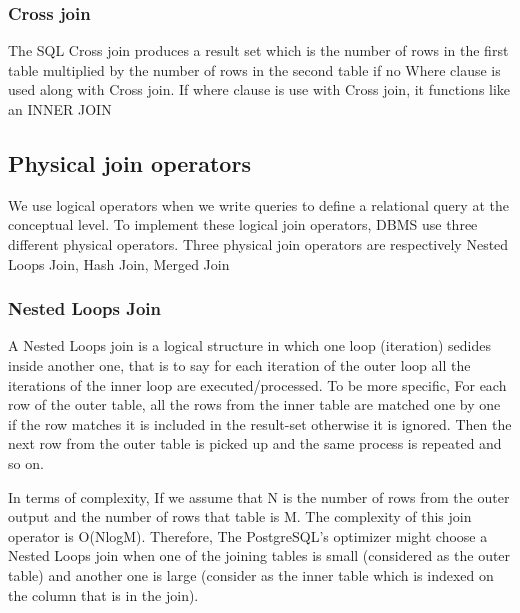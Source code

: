 \subsubsection{Cross join}
{\justify
The SQL Cross join produces a result set which is the number of rows in the first table multiplied by the number of rows in the second table if no Where clause is used along with Cross join. If where clause is use with Cross join, it functions like an INNER JOIN
\par }
\vspace{0.5cm}
\subsection{Physical join operators}
{\justify
We use logical operators when we write queries to define a relational query at the conceptual level. To implement these logical join operators, DBMS use three different physical operators. Three physical join operators are respectively Nested Loops Join, Hash Join, Merged Join
\par }
\vspace{0.5cm}
\subsubsection{Nested Loops Join}
{\justify
A Nested Loops join \cite{physical operators} is a logical structure in which one loop (iteration) sedides inside another one, that is to say for each iteration of the outer loop all the iterations of the inner loop are executed/processed. To be more specific, For each row of the outer table, all the rows from the inner table are matched one by one if the row matches it is included in the result-set otherwise it is ignored. Then the next row from the outer table is picked up and the same process is repeated and so on.
\par }
\vspace{0.5cm}
{\justify
In terms of complexity, If we assume that N is the number of rows from the outer output and the number of rows that table is M. The complexity of this join operator is O(NlogM). Therefore, The PostgreSQL's optimizer might choose a Nested Loops join when  one of the joining tables is small (considered as the outer table) and another one is large (consider as the inner table which is indexed on the column that is in the join).
\par }
\vspace{0.5cm}
